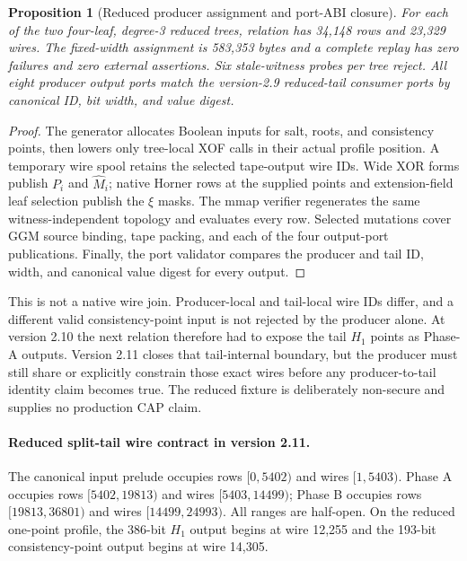 \documentclass[11pt]{article}
\newtheorem{proposition}[definition]{Proposition}
\begin{document}
\begin{proposition}[Reduced producer assignment and port-ABI closure]
For each of the two four-leaf, degree-3 reduced trees, relation
 has 34,148 rows and 23,329 wires.
The fixed-width assignment is 583,353 bytes and a complete replay has zero
failures and zero external assertions.  Six stale-witness probes per tree
reject.  All eight producer output ports match the version-2.9 reduced-tail
consumer ports by canonical ID, bit width, and value digest.
\end{proposition}
\begin{proof}
The generator allocates Boolean inputs for salt, roots, and consistency
points, then lowers only tree-local XOF calls in their actual profile position.
A temporary wire spool retains the selected tape-output wire IDs.  Wide XOR
forms publish $P_i$ and $\widehat M_i$; native Horner rows at the supplied
points and extension-field leaf selection publish the $\xi$ masks.  The mmap
verifier regenerates the same witness-independent topology and evaluates every
row.  Selected mutations cover GGM source binding, tape packing, and each of
the four output-port publications.  Finally, the port validator compares the
producer and tail ID, width, and canonical value digest for every output.
\end{proof}

This is not a native wire join.  Producer-local and tail-local wire IDs differ,
and a different valid consistency-point input is not rejected by the producer
alone.  At version 2.10 the next relation therefore had to expose the tail
$H_1$ points as Phase-A outputs.  Version 2.11 closes that tail-internal
boundary, but the producer must still share or explicitly constrain those exact
wires before any producer-to-tail identity claim becomes true.  The reduced
fixture is deliberately non-secure and supplies no production CAP claim.

\paragraph{Reduced split-tail wire contract in version 2.11.}
The canonical input prelude occupies rows $[0,5402)$ and wires $[1,5403)$.
Phase A occupies rows $[5402,19813)$ and wires $[5403,14499)$; Phase B occupies
rows $[19813,36801)$ and wires $[14499,24993)$.  All ranges are half-open.  On
the reduced one-point profile, the 386-bit $H_1$ output begins at wire 12,255
and the 193-bit consistency-point output begins at wire 14,305.
\end{document}
